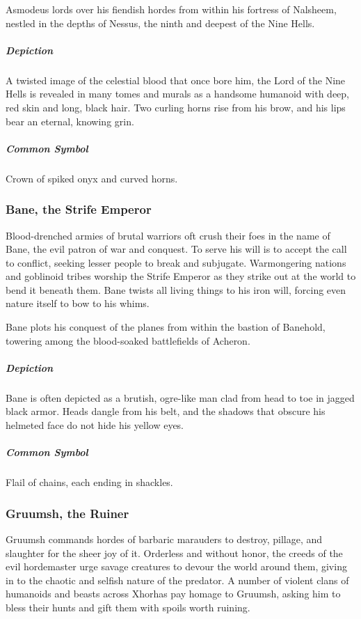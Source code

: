 \documentclass[letterpaper, twocolumn, openany, nodeprecatedcode, layout=true]{dndbook}
\begin{document}
Asmodeus lords over his fiendish hordes from within his fortress of Nalsheem, nestled in the
depths of Nessus, the ninth and deepest of the Nine Hells.

\subparagraph{Depiction}
A twisted image of the celestial blood that once bore him, the Lord of the Nine Hells is
revealed in many tomes and murals as a handsome humanoid with deep, red skin and long,
black hair. Two curling horns rise from his brow, and his lips bear an eternal, knowing grin.

\subparagraph{Common Symbol}
Crown of spiked onyx and curved horns.

\subsubsection{Bane, the Strife Emperor}

Blood-drenched armies of brutal warriors oft crush their foes in the name of Bane, the evil
patron of war and conquest. To serve his will is to accept the call to conflict, seeking
lesser people to break and subjugate. Warmongering nations and goblinoid tribes worship the
Strife Emperor as they strike out at the world to bend it beneath them. Bane twists all
living things to his iron will, forcing even nature itself to bow to his whims.

Bane plots his conquest of the planes from within the bastion of Banehold, towering among
the blood-soaked battlefields of Acheron.

\subparagraph{Depiction}
Bane is often depicted as a brutish, ogre-like man clad from head to toe in jagged black armor.
Heads dangle from his belt, and the shadows that obscure his helmeted face do not hide his
yellow eyes.

\subparagraph{Common Symbol}
Flail of chains, each ending in shackles.

\subsubsection{Gruumsh, the Ruiner}

Gruumsh commands hordes of barbaric marauders to destroy, pillage, and slaughter for the sheer
joy of it. Orderless and without honor, the creeds of the evil hordemaster urge savage
creatures to devour the world around them, giving in to the chaotic and selfish nature of
the predator. A number of violent clans of humanoids and beasts across Xhorhas pay homage to
Gruumsh, asking him to bless their hunts and gift them with spoils worth ruining.
\end{document}
